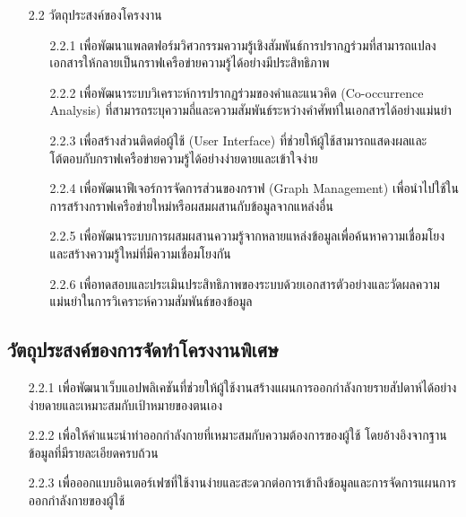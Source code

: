 \documentclass[12pt,a4paper]{article}
\newcommand{\textlight}[1]{{\thailightfont #1}}
\begin{document}
\begin{enumerate}[leftmargin=2cm]
    \item[2.2] วัตถุประสงค์ของโครงงาน
    \vspace{0.05cm}
    \textlight{
        \begin{enumerate}
            \item[2.2.1] เพื่อพัฒนาแพลตฟอร์มวิศวกรรมความรู้เชิงสัมพันธ์การปรากฏร่วมที่สามารถแปลงเอกสารให้กลายเป็นกราฟเครือข่ายความรู้ได้อย่างมีประสิทธิภาพ
            \item[2.2.2] เพื่อพัฒนาระบบวิเคราะห์การปรากฏร่วมของคำและแนวคิด (Co-occurrence Analysis) ที่สามารถระบุความถี่และความสัมพันธ์ระหว่างคำศัพท์ในเอกสารได้อย่างแม่นยำ
            \item[2.2.3] เพื่อสร้างส่วนติดต่อผู้ใช้ (User Interface) ที่ช่วยให้ผู้ใช้สามารถแสดงผลและโต้ตอบกับกราฟเครือข่ายความรู้ได้อย่างง่ายดายและเข้าใจง่าย
            \item[2.2.4] เพื่อพัฒนาฟีเจอร์การจัดการส่วนของกราฟ (Graph Management) เพื่อนำไปใช้ในการสร้างกราฟเครือข่ายใหม่หรือผสมผสานกับข้อมูลจากแหล่งอื่น
            \item[2.2.5] เพื่อพัฒนาระบบการผสมผสานความรู้จากหลายแหล่งข้อมูลเพื่อค้นหาความเชื่อมโยงและสร้างความรู้ใหม่ที่มีความเชื่อมโยงกัน
            \item[2.2.6] เพื่อทดสอบและประเมินประสิทธิภาพของระบบด้วยเอกสารตัวอย่างและวัดผลความแม่นยำในการวิเคราะห์ความสัมพันธ์ของข้อมูล
        \end{enumerate}
    }
    
\end{enumerate}

\subsection{วัตถุประสงค์ของการจัดทำโครงงานพิเศษ}
\begin{enumerate}
    \item[2.2.1] เพื่อพัฒนาเว็บแอปพลิเคชันที่ช่วยให้ผู้ใช้งานสร้างแผนการออกกำลังกายรายสัปดาห์ได้อย่างง่ายดายและเหมาะสมกับเป้าหมายของตนเอง
    \item[2.2.2] เพื่อให้คำแนะนำท่าออกกำลังกายที่เหมาะสมกับความต้องการของผู้ใช้ โดยอ้างอิงจากฐานข้อมูลที่มีรายละเอียดครบถ้วน
    \item[2.2.3] เพื่อออกแบบอินเตอร์เฟซที่ใช้งานง่ายและสะดวกต่อการเข้าถึงข้อมูลและการจัดการแผนการออกกำลังกายของผู้ใช้
\end{enumerate}
\end{document}
